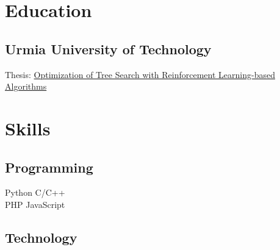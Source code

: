 \documentclass[]{deedy-resume-reversed}
\begin{document}
\begin{minipage}[t]{0.60\textwidth}

% 
% 

%
%

\end{minipage}
\hfill
\begin{minipage}[t]{0.33\textwidth}


\section{Education}

\subsection{Urmia University of Technology}
Thesis: \href{https://github.com/masouduut94/MCTS-agent-python}{Optimization of Tree Search with Reinforcement Learning-based Algorithms}
\sectionsep


\section{Skills}
\subsection{Programming}
\location{}
Python \textbullet{} C/C++ \\
PHP \textbullet{} JavaScript \\
\sectionsep

\subsection{Technology}
      \\
    \\
    \\
    \\
\sectionsep


\end{minipage}
\end{document}

